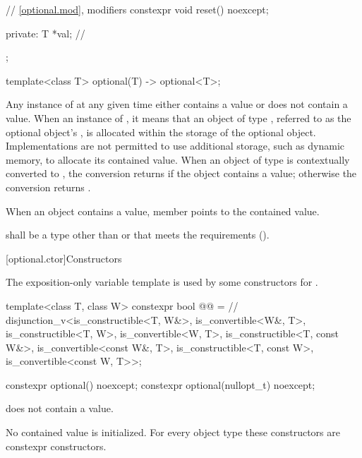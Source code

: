 \begin{codeblock}
{{    // \ref{optional.mod}, modifiers
    constexpr void reset() noexcept;

  private:
    T *val;         // \expos
  };

  template<class T>
    optional(T) -> optional<T>;
}
\end{codeblock}

\pnum
Any instance of  at any given time either contains a value or does not contain a value.
When an instance of  ,
it means that an object of type , referred to as the optional object's ,
is allocated within the storage of the optional object.
Implementations are not permitted to use additional storage, such as dynamic memory, to allocate its contained value.
When an object of type  is contextually converted to ,
the conversion returns  if the object contains a value;
otherwise the conversion returns .

\pnum
When an  object contains a value,
member  points to the contained value.

\pnum
{} shall be a type
other than \cv{}  or \cv{} 
that meets the  requirements ().

[optional.ctor]{Constructors}

\pnum
The exposition-only variable template 
is used by some constructors for .
\begin{codeblock}
template<class T, class W>
constexpr bool @@ =  // \expos
  disjunction_v<is_constructible<T, W&>, is_convertible<W&, T>,
                is_constructible<T, W>, is_convertible<W, T>,
                is_constructible<T, const W&>, is_convertible<const W&, T>,
                is_constructible<T, const W>, is_convertible<const W, T>>;
\end{codeblock}

%
\begin{itemdecl}
constexpr optional() noexcept;
constexpr optional(nullopt_t) noexcept;
\end{itemdecl}

\begin{itemdescr}
\pnum
\ensures
{} does not contain a value.

\pnum
\remarks
No contained value is initialized.
For every object type  these constructors are constexpr constructors.
\end{itemdescr}

